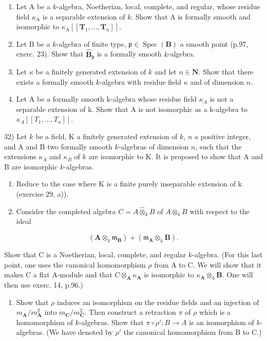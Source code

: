 \begin{enumerate}
\def\labelenumi{\alph{enumi})}
\item
  Let A be a \(k\)-algebra, Noetherian, local, complete, and regular, whose residue field \(\kappa_{\mathrm{A}}\) is a separable extension of \(k\). Show that A is formally smooth and isomorphic to \(\kappa_{\mathrm{A}}[[\mathbf{T}_{1}, ..., \mathbf{T}_{n}]]\).
\item
  Let B be a \(k\)-algebra of finite type, \(\mathfrak{p} \in \operatorname{Spec}(\mathbf{B})\) a smooth point (p.97, exerc. 23). Show that \(\hat{\mathbf{B}}_{\mathfrak{p}}\) is a formally smooth \(k\)-algebra.
\item
  Let \(\kappa\) be a finitely generated extension of \(k\) and let \(n\in\mathbf{N}\). Show that there exists a formally smooth \(k\)-algebra with residue field \(\kappa\) and of dimension \(n\).
\item
  Let A be a formally smooth k-algebra whose residue field \(\kappa_{A}\) is not a separable extension of k. Show that A is not isomorphic as a k-algebra to \(\kappa_{A}[[T_{1},...,T_{n}]]\).
\end{enumerate}

32) Let \(k\) be a field, K a finitely generated extension of \(k\), \(n\) a positive integer, and A and B two formally smooth \(k\)-algebras of dimension \(n\), such that the extensions \(\kappa_{A}\) and \(\kappa_{B}\) of \(k\) are isomorphic to K. It is proposed to show that A and B are isomorphic \(k\)-algebras.

\begin{enumerate}
\def\labelenumi{\alph{enumi})}
\item
  Reduce to the case where K is a finite purely inseparable extension of k (exercise 29, a)).
\item
  Consider the completed algebra \(C = A \hat{\otimes}_{k} B\) of \(A \otimes_{k} B\) with respect to the ideal
\end{enumerate}

\[
\left(\mathbf {A} \otimes_ {k} \mathfrak {m} _ {\mathbf {B}}\right) + \left(\mathfrak {m} _ {\mathbf {A}} \otimes_ {k} \mathbf {B}\right).
\]

Show that C is a Noetherian, local, complete, and regular \(k\)-algebra. (For this last point, one uses the canonical homomorphism \(\rho\) from A to C. We will show that it makes C a flat A-module and that \(C \otimes_{\mathbf{A}} \kappa_{\mathbf{A}}\) is isomorphic to \(\kappa_{\mathbf{A}} \otimes_{k} \mathbf{B}\). One will then use exerc. 14, p.96.)

\begin{enumerate}
\def\labelenumi{\alph{enumi})}
\setcounter{enumi}{2}
\tightlist
\item
  Show that \(\rho\) induces an isomorphism on the residue fields and an injection of \(m_{\mathbf{A}}/m_{\mathbf{A}}^{2}\) into \(m_{\mathbf{C}}/m_{\mathbf{C}}^{2}\). Then construct a retraction \(\pi\) of \(\rho\) which is a homomorphism of \(k\)-algebras. Show that \(\pi \circ \rho': B \to A\) is an isomorphism of \(k\)-algebras. (We have denoted by \(\rho'\) the canonical homomorphism from B to C.)
\end{enumerate}

